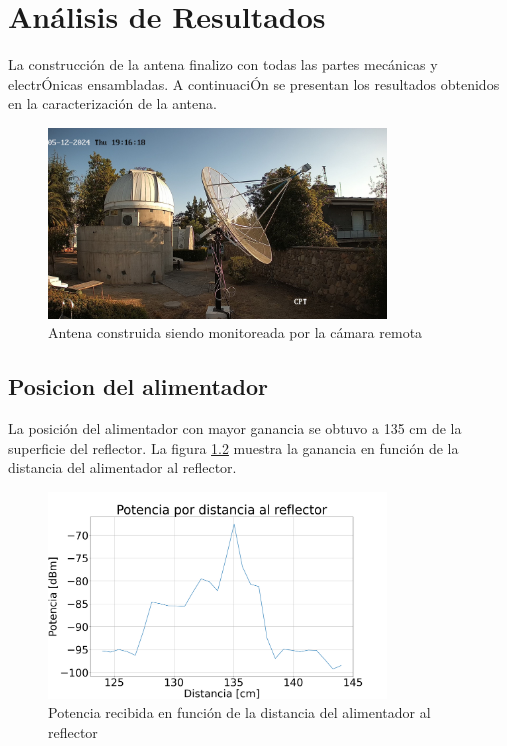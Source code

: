 \chapter{Análisis de Resultados}

La construcción de la antena finalizo con todas las partes mecánicas y electrÓnicas ensambladas. A continuaciÓn se presentan los resultados obtenidos en la caracterización de la antena.\\

\begin{figure}
    \centering
    \includegraphics[width=0.8\textwidth]{img/antenna}
    \caption{Antena construida siendo monitoreada por la cámara remota}
    \label{fig:antena}
\end{figure}

\section{Posicion del alimentador}

La posición del alimentador con mayor ganancia se obtuvo a 135 cm de la superficie del reflector. La figura \ref{fig:distancia} muestra la ganancia en función de la distancia del alimentador al reflector.\\

\begin{figure}
    \centering
    \includegraphics[width=0.8\textwidth]{img/enfoqueDist}
    \caption{Potencia recibida en función de la distancia del alimentador al reflector}
    \label{fig:distancia}
\end{figure}

